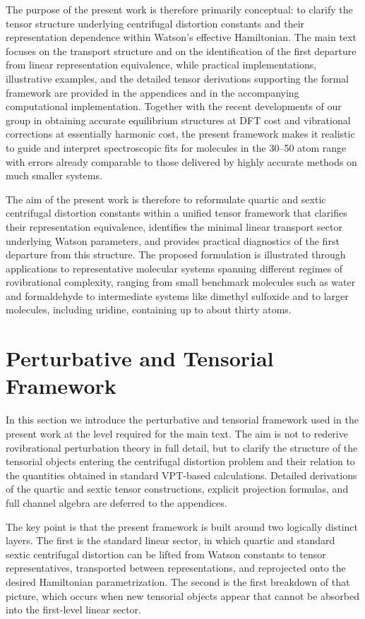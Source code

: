 \documentclass[journal=jacsat,manuscript=article]{achemso}
\begin{document}
The purpose of the present work is therefore primarily conceptual: to
clarify the tensor structure underlying centrifugal distortion
constants and their representation dependence within Watson's effective
Hamiltonian. The main text focuses on the transport structure and on
the identification of the first departure from linear representation
equivalence, while practical implementations, illustrative examples,
and the detailed tensor derivations supporting the formal framework
are provided in the appendices and in the accompanying computational
implementation. Together with the recent developments of our group in
obtaining accurate equilibrium structures at DFT cost and vibrational
corrections at essentially harmonic cost, the present framework makes
it realistic to guide and interpret spectroscopic fits for molecules in
the 30--50 atom range with errors already comparable to those delivered
by highly accurate methods on much smaller systems.

The aim of the present work is therefore to reformulate quartic and sextic
centrifugal distortion constants within a unified tensor framework that
clarifies their representation equivalence, identifies the minimal linear
transport sector underlying Watson parameters, and provides practical
diagnostics of the first departure from this structure. The proposed
formulation is illustrated through applications to representative
molecular systems spanning different regimes of rovibrational complexity,
ranging from small benchmark molecules such as water and formaldehyde to
intermediate systems like dimethyl sulfoxide and to larger molecules,
including uridine, containing up to about thirty atoms.


\section{Perturbative and Tensorial Framework}

In this section we introduce the perturbative and tensorial framework
used in the present work at the level required for the main text.
The aim is not to rederive rovibrational perturbation theory in full
detail, but to clarify the structure of the tensorial objects entering
the centrifugal distortion problem and their relation to the
quantities obtained in standard VPT-based calculations. Detailed
derivations of the quartic and sextic tensor constructions, explicit
projection formulas, and full channel algebra are deferred to the
appendices.

The key point is that the present framework is built around two
logically distinct layers. The first is the standard linear sector, in
which quartic and standard sextic centrifugal distortion can be lifted
from Watson constants to tensor representatives, transported between
representations, and reprojected onto the desired Hamiltonian
parametrization. The second is the first breakdown of that picture,
which occurs when new tensorial objects appear that cannot be absorbed
into the first-level linear sector.
\end{document}
